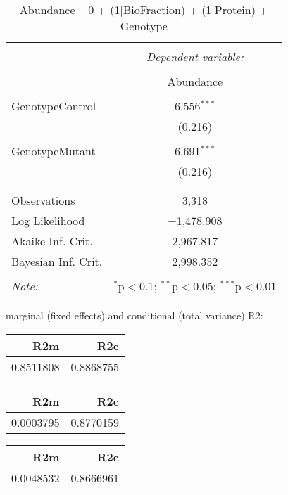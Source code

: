 \documentclass[11pt]{report}
\begin{document}
\begin{table}[!htbp] \centering 
  \caption{Abundance ~ 0 + (1|BioFraction) + (1|Protein) + Genotype} 
  \label{} 
\begin{tabular}{@{\extracolsep{5pt}}lc} 
\\[-1.8ex]\hline 
\hline \\[-1.8ex] 
 & \multicolumn{1}{c}{\textit{Dependent variable:}} \\ 
\cline{2-2} 
\\[-1.8ex] & Abundance \\ 
\hline \\[-1.8ex] 
 GenotypeControl & 6.556$^{***}$ \\ 
  & (0.216) \\ 
  & \\ 
 GenotypeMutant & 6.691$^{***}$ \\ 
  & (0.216) \\ 
  & \\ 
\hline \\[-1.8ex] 
Observations & 3,318 \\ 
Log Likelihood & $-$1,478.908 \\ 
Akaike Inf. Crit. & 2,967.817 \\ 
Bayesian Inf. Crit. & 2,998.352 \\ 
\hline 
\hline \\[-1.8ex] 
\textit{Note:}  & \multicolumn{1}{r}{$^{*}$p$<$0.1; $^{**}$p$<$0.05; $^{***}$p$<$0.01} \\ 
\end{tabular} 
\end{table} 
marginal (fixed effects) and conditional (total variance) R2:

\begin{tabular}{r|r}
\hline
R2m & R2c\\
\hline
0.8511808 & 0.8868755\\
\hline
\end{tabular}

\begin{tabular}{r|r}
\hline
R2m & R2c\\
\hline
0.0003795 & 0.8770159\\
\hline
\end{tabular}

\begin{tabular}{r|r}
\hline
R2m & R2c\\
\hline
0.0048532 & 0.8666961\\
\hline
\end{tabular}
\end{document}

